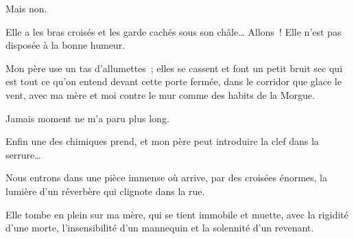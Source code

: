 \documentclass[french,twoside]{book} %
\newcommand{\astertri}{\medskip\par\centerline{\color{rubric}\large\selectfont{\syms ✻\,✻\,✻}}\medskip\par}%
\begin{document}
Mais non.\par
Elle a les bras croisés et les garde cachés sous son châle… Allons ! Elle n’est pas disposée à la bonne humeur.\par
Mon père use un tas d’allumettes ; elles se cassent et font un petit bruit sec qui est tout ce qu’on entend devant cette porte fermée, dans le corridor que glace le vent, avec ma mère et moi contre le mur comme des habits de la Morgue.\par
Jamais moment ne m’a paru plus long.\par
Enfin une des chimiques prend, et mon père peut introduire la clef dans la serrure…\par
Nous entrons dans une pièce immense où arrive, par des croisées énormes, la lumière d’un réverbère qui clignote dans la rue.\par
Elle tombe en plein sur ma mère, qui se tient immobile et muette, avec la rigidité d’une morte, l’insensibilité d’un mannequin et la solennité d’un revenant.\par

\astertri
\end{document}
